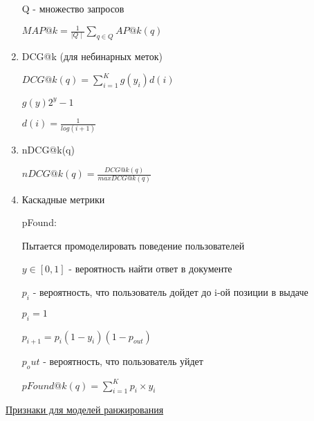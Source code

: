 \documentclass[a4paper, 12pt]{article}
\begin{document}
\begin{enumerate}
    Q - множество запросов

    \(MAP@k = \frac{1}{\mid Q \mid}\sum_{q \in Q}AP@k(q)\)

    \item DCG@k (для небинарных меток)
    
    \(DCG@k(q) = \sum_{i = 1}^K g(y_i)d(i)\)

    \(g(y)  2^y - 1\)
    
    \(d(i) = \frac{1}{log(i + 1)}\)

    \item nDCG@k(q)
    
    \(nDCG@k(q) = \frac{DCG@k(q)}{max DCG@k(q)}\)

    \item Каскадные метрики

    pFound:

    Пытается промоделировать поведение пользователей

    $y \in [0, 1]$ - вероятность найти ответ в документе

    $p_i$ - вероятность, что пользователь дойдет до i-ой
    позиции в выдаче

    $p_i = 1$

    $p_{i + 1} = p_i(1 - y_i)(1 - p_{out})$

    $p_out$ - вероятность, что пользователь уйдет

    $pFound@k(q) = \sum_{i = 1}^K p_i \times y_i$
\end{enumerate}

\underline{Признаки для моделей ранжирования}
\end{document}
